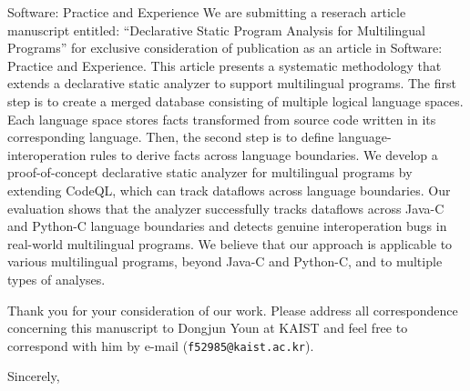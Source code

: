 \documentclass{letter}
\begin{document}
\begin{letter}{
Software: Practice and Experience
}
We are submitting a reserach article manuscript entitled: ``Declarative Static Program Analysis
for Multilingual Programs'' for exclusive consideration of publication as an
article in Software: Practice and Experience.
This article presents a systematic methodology that extends a declarative static
analyzer to support multilingual programs.  The first step is to create a
merged database consisting of multiple logical language spaces. Each language
space stores facts transformed from source code written in its corresponding
language.  Then, the second step is to define language-interoperation rules to
derive facts across language boundaries.  We develop a proof-of-concept
declarative static analyzer for multilingual programs by extending CodeQL,
which can track dataflows across language boundaries. Our evaluation shows that
the analyzer successfully tracks dataflows across Java-C and Python-C language
boundaries and detects genuine interoperation bugs in real-world multilingual
programs.  We believe that our approach is applicable to various multilingual
programs, beyond Java-C and Python-C, and to multiple types of analyses.

\medskip

Thank you for your consideration of our work.
Please address all correspondence concerning this manuscript to Dongjun Youn at KAIST and
feel free to correspond with him by e-mail ({\tt f52985@kaist.ac.kr}).

\closing{Sincerely,}
\end{letter}
\end{document}
